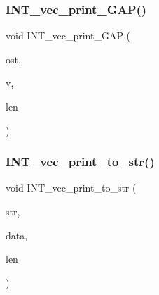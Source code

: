 \mbox{\label{util_8_c_ae2cc7aa118a0fc36468c296c4e7440f6}} 
\subsubsection{\texorpdfstring{I\+N\+T\+\_\+vec\+\_\+print\+\_\+\+G\+A\+P()}{INT\_vec\_print\_GAP()}}
{\footnotesize\ttfamily void I\+N\+T\+\_\+vec\+\_\+print\+\_\+\+G\+AP (\begin{DoxyParamCaption}\item[{ostream \&}]{ost,  }\item[{\mbox{\hyperlink{galois_8h_a09fddde158a3a20bd2dcadb609de11dc}{I\+NT}} $\ast$}]{v,  }\item[{\mbox{\hyperlink{galois_8h_a09fddde158a3a20bd2dcadb609de11dc}{I\+NT}}}]{len }\end{DoxyParamCaption})}

\mbox{\label{util_8_c_abadd2acf410e5c491f6740899538160d}} 
\subsubsection{\texorpdfstring{I\+N\+T\+\_\+vec\+\_\+print\+\_\+to\+\_\+str()}{INT\_vec\_print\_to\_str()}}
{\footnotesize\ttfamily void I\+N\+T\+\_\+vec\+\_\+print\+\_\+to\+\_\+str (\begin{DoxyParamCaption}\item[{\mbox{\hyperlink{galois_8h_ab6cc7b4aeb6ea31aba2b3fbfc83ff5e6}{B\+Y\+TE}} $\ast$}]{str,  }\item[{\mbox{\hyperlink{galois_8h_a09fddde158a3a20bd2dcadb609de11dc}{I\+NT}} $\ast$}]{data,  }\item[{\mbox{\hyperlink{galois_8h_a09fddde158a3a20bd2dcadb609de11dc}{I\+NT}}}]{len }\end{DoxyParamCaption})}

\mbox{\label{util_8_c_a9aa706d3f0c3bb83182eed9ab9747582}} 
